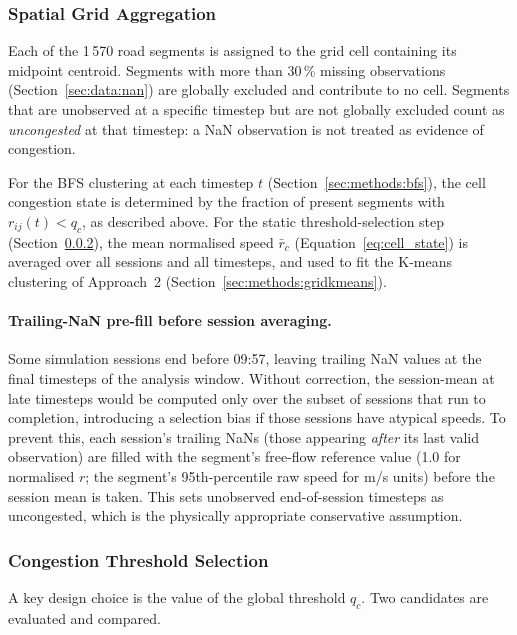 \documentclass[11pt,a4paper]{article}
\begin{document}
\subsubsection{Spatial Grid Aggregation}
\label{sec:methods:grid}

Each of the 1\,570 road segments is assigned to the grid cell containing its
midpoint centroid.  Segments with more than 30\,\% missing observations
(Section~\ref{sec:data:nan}) are globally excluded and contribute to no cell.
Segments that are unobserved at a specific timestep but are not globally
excluded count as \emph{uncongested} at that timestep: a NaN observation is
not treated as evidence of congestion.

For the BFS clustering at each timestep $t$ (Section~\ref{sec:methods:bfs}),
the cell congestion state is determined by the fraction of present segments
with $r_{ij}(t) < q_c$, as described above.  For the static
threshold-selection step (Section~\ref{sec:methods:percolation}), the mean
normalised speed $\bar{r}_c$ (Equation~\ref{eq:cell_state}) is averaged over
all sessions and all timesteps, and used to fit the K-means clustering of
Approach~2 (Section~\ref{sec:methods:gridkmeans}).

\paragraph{Trailing-NaN pre-fill before session averaging.}
Some simulation sessions end before 09:57, leaving trailing NaN values at the
final timesteps of the analysis window.  Without correction, the session-mean
at late timesteps would be computed only over the subset of sessions that run
to completion, introducing a selection bias if those sessions have atypical
speeds.  To prevent this, each session's trailing NaNs (those appearing
\emph{after} its last valid observation) are filled with the segment's
free-flow reference value (1.0 for normalised $r$; the segment's 95th-percentile
raw speed for m/s units) before the session mean is taken.  This sets
unobserved end-of-session timesteps as uncongested, which is the physically
appropriate conservative assumption.

\subsubsection{Congestion Threshold Selection}
\label{sec:methods:percolation}

A key design choice is the value of the global threshold $q_c$.  Two candidates
are evaluated and compared.
\end{document}
